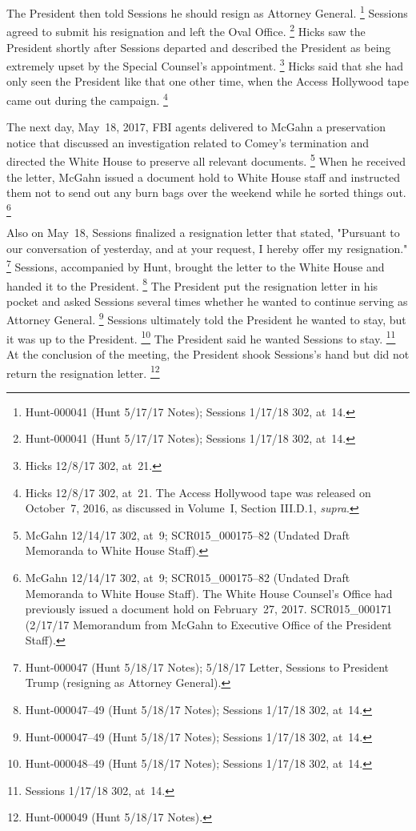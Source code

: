 The President then told Sessions he should resign as Attorney General.%
\footnote{Hunt-000041 (Hunt 5/17/17 Notes);
Sessions 1/17/18 302, at~14.}
Sessions agreed to submit his resignation and left the Oval Office.%
\footnote{Hunt-000041 (Hunt 5/17/17 Notes);
Sessions 1/17/18 302, at~14.}
Hicks saw the President shortly after Sessions departed and described the President as being extremely upset by the Special Counsel's appointment.%
\footnote{Hicks 12/8/17 302, at~21.}
Hicks said that she had only seen the President like that one other time, when the Access Hollywood tape came out during the campaign.%
\footnote{Hicks 12/8/17 302, at~21.
The Access Hollywood tape was released on October~7, 2016, as discussed in Volume~I, Section III.D.1, \textit{supra}.}

The next day, May~18, 2017, FBI agents delivered to McGahn a preservation notice that discussed an investigation related to Comey's termination and directed the White House to preserve all relevant documents.%
\footnote{McGahn 12/14/17 302, at~9;
SCR015\_000175--82 (Undated Draft Memoranda to White House Staff).}
When he received the letter, McGahn issued a document hold to White House staff and instructed them not to send out any burn bags over the weekend while he sorted things out.%
\footnote{McGahn 12/14/17 302, at~9;
SCR015\_000175--82 (Undated Draft Memoranda to White House Staff).
The White House Counsel's Office had previously issued a document hold on February~27, 2017.
SCR015\_000171 (2/17/17 Memorandum from McGahn to Executive Office of the President Staff).}

Also on May~18, Sessions finalized a resignation letter that stated, "Pursuant to our conversation of yesterday, and at your request, I hereby offer my resignation."%
\footnote{Hunt-000047 (Hunt 5/18/17 Notes); 5/18/17 Letter, Sessions to President Trump (resigning as Attorney General).}
Sessions, accompanied by Hunt, brought the letter to the White House and handed it to the President.%
\footnote{Hunt-000047--49 (Hunt 5/18/17 Notes);
Sessions 1/17/18 302, at~14.}
The President put the resignation letter in his pocket and asked Sessions several times whether he wanted to continue serving as Attorney General.%
\footnote{Hunt-000047--49 (Hunt 5/18/17 Notes);
Sessions 1/17/18 302, at~14.}
Sessions ultimately told the President he wanted to stay, but it was up to the President.%
\footnote{Hunt-000048--49 (Hunt 5/18/17 Notes);
Sessions 1/17/18 302, at~14.}
The President said he wanted Sessions to stay.%
\footnote{Sessions 1/17/18 302, at~14.}
At the conclusion of the meeting, the President shook Sessions's hand but did not return the resignation letter.%
\footnote{Hunt-000049 (Hunt 5/18/17 Notes).}

